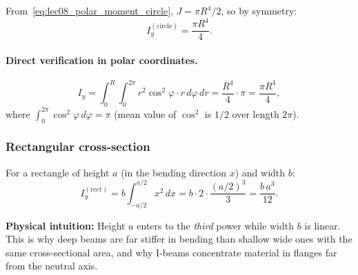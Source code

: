\documentclass[../main.tex]{subfiles}
\begin{document}
From~\eqref{eq:lec08_polar_moment_circle}, $J = \pi R^4/2$, so by symmetry:
\begin{equation}
    \boxed{I_y^{(\mathrm{circle})} = \frac{\pi R^4}{4}.}
    \label{eq:lec08_Iy_circle}
\end{equation}

\paragraph{Direct verification in polar coordinates.}
\[
    I_y = \int_0^R \int_0^{2\pi} r^2\cos^2\!\varphi \cdot r\,d\varphi\,dr
    = \frac{R^4}{4}\cdot\pi = \frac{\pi R^4}{4},
\]
where $\int_0^{2\pi}\cos^2\!\varphi\,d\varphi = \pi$ (mean value of $\cos^2$ is $1/2$ over length $2\pi$).

\subsubsection*{Rectangular cross-section}

For a rectangle of height $a$ (in the bending direction $x$) and width $b$:
\begin{equation}
    I_y^{(\mathrm{rect})} = b\int_{-a/2}^{a/2} x^2\,dx
    = b\cdot 2\cdot\frac{(a/2)^3}{3}
    = \frac{b\,a^3}{12}.
    \label{eq:lec08_Iy_rectangle}
\end{equation}

\noindent\textbf{Physical intuition:} Height $a$ enters to the \emph{third} power while width $b$ is linear. This is why deep beams are far stiffer in bending than shallow wide ones with the same cross-sectional area, and why I-beams concentrate material in flanges far from the neutral axis.
\end{document}
